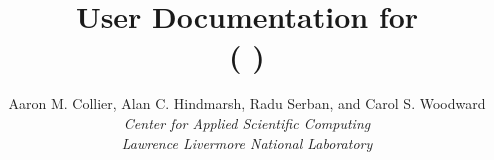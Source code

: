 \documentclass[twoside,openright,10pt]{report}
\title{User Documentation for {\kinsol} {\kinrelease} \\
           ({\sundials} {\sunrelease})}
\author{
  Aaron M. Collier, Alan C. Hindmarsh, Radu Serban, and Carol S. Woodward\\
  {\em Center for Applied Scientific Computing} \\
  {\em Lawrence Livermore National Laboratory}
}
\date{
  \today 
  \vfill
  {\centerline{\texttt{[image: doc\_logo\_blue]}}}
  \vfill \kinucrlug
}
\begin{document}
\frontug
\renewcommand{\chaptermark}[1]{\markboth{#1}{}}
\renewcommand{\sectionmark}[1]{\markright{\thesection\ #1}}


\clearemptydoublepage

\clearemptydoublepage

\clearemptydoublepage

\clearemptydoublepage

\clearemptydoublepage

\clearemptydoublepage

\clearemptydoublepage

\clearemptydoublepage

\clearemptydoublepage

\clearemptydoublepage
\appendix

\clearemptydoublepage

\clearemptydoublepage


\clearemptydoublepage
\printindex
\clearemptydoublepage
\end{document}
